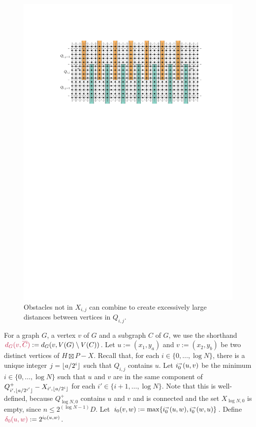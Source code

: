 \documentclass{patmorin}
\makeatletter
\renewcommand{\le}{\leqslant}
\def\mathcolor#1#{\@mathcolor{#1}}
\def\@mathcolor#1#2#3{%
  \protect\leavevmode
  \begingroup
    \color#1{#2}#3%
  \endgroup
}
\newcommand{\mathdefin}[1]{\mathcolor{brightmaroon}{#1}}
\makeatother
\begin{document}
\begin{figure}
  \centering
  \includegraphics{figs/bad_combination}
  \caption{Obstacles not in $X_{i,j}$ can combine to create excessively large distances between vertices in $Q_{i,j}$.}
  \label{big_distance}
\end{figure}




For a graph $G$, a vertex $v$ of $G$ and a subgraph $C$ of $G$, we use the shorthand $\mathdefin{d_G(v,\overline{C})}:=d_G(v,V(G)\setminus V(C))$. Let $u:=(x_1,y_a)$ and $v:=(x_2,y_b)$ be two distinct vertices of $H\boxtimes P-X$.  Recall that, for each $i\in\{0,\ldots,\log N\}$, there is a unique integer $j={\lfloor a/2^i \rfloor}$ such that $Q_{i,j}$ contains $u$.  Let $i_0^{\shortrightarrow}(u,v)$ be the minimum $i\in\{0,\ldots,\log N\}$ such that $u$ and $v$ are in the same component of $Q^+_{i',{\lfloor a/2^{i'} \rfloor}}-X_{i',{\lfloor a/2^i \rfloor}}$ for each $i'\in\{i+1,\ldots,\log N\}$.  Note that this is well-defined, because $Q^+_{\log N,0}$ contains $u$ and $v$ and is connected and the set $X_{\log N,0}$ is empty, since $n\le 2^{(\log N-1)} D$.  Let $i_0(v,w):=\max\{i_0^{\shortrightarrow}(u,w),i_0^{\shortrightarrow}(w,u)\}$. Define $\mathdefin{\delta_0(u,w)}:=2^{i_0(u,w)}$.
\end{document}
